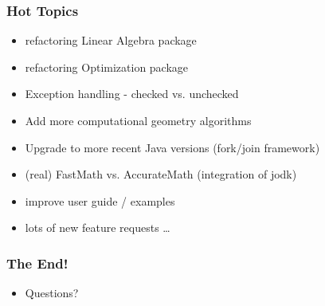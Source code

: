 \documentclass[10pt,mathserif]{beamer}
\begin{document}
\begin{frame}
  \frametitle{Hot Topics}

\begin{itemize}
  \item refactoring Linear Algebra package
  \item refactoring Optimization package
  \item Exception handling - checked vs. unchecked
  \item Add more computational geometry algorithms
  \item Upgrade to more recent Java versions (fork/join framework)
  \item (real) FastMath vs. AccurateMath (integration of jodk)
  \item improve user guide / examples
  \item lots of new feature requests \ldots
\end{itemize}

\end{frame}

\begin{frame}
  \frametitle{The End!}

\begin{itemize}
  \item Questions?
\end{itemize}

\end{frame}
\end{document}
